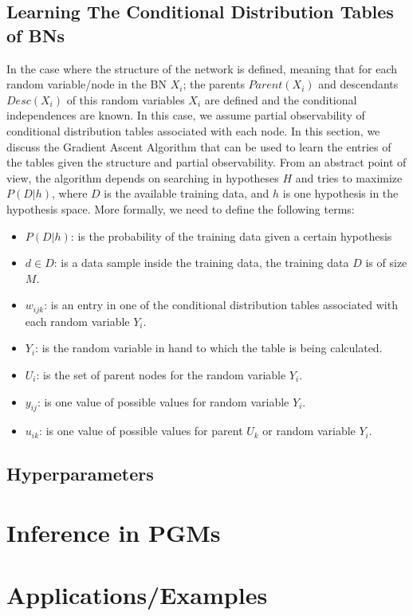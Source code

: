 \documentclass{article}
\begin{document}
\subsection{Learning The Conditional Distribution Tables of BNs}
In the case where the structure of the network is defined, meaning that for each random variable/node in the BN $X_i$; the parents $Parent(X_i)$ and descendants $Desc(X_i)$ of this random variables $X_i$ are defined and the conditional independences are known. In this case, we assume partial observability of conditional distribution tables associated with each node. In this section, we discuss the Gradient Ascent Algorithm that can be used to learn the entries of the tables given the structure and partial observability. From an abstract point of view, the algorithm depends on searching in hypotheses $H$ and tries to maximize $P(D|h)$, where $D$ is the available training data, and $h$ is one hypothesis in the hypothesis space. More formally, we need to define the following terms:
\begin{itemize}
\item $P(D|h)$: is the probability of the training data given a certain hypothesis
\item $d \in D$: is a data sample inside the training data, the training data $D$ is of size $M$.
\item $w_{ijk}$: is an entry in one of the conditional distribution tables associated with each random variable $Y_i$.
\item $Y_{i}$: is the random variable in hand to which the table is being calculated.
\item $U_{i}$: is the set of parent nodes for the random variable $Y_i$.
\item $y_{ij}$: is one value of possible values for random variable $Y_i$.
\item $u_{ik}$: is one value of possible values for parent $U_k$ or random variable $Y_i$.
\end{itemize}


\subsection{Hyperparameters}
\section{Inference in PGMs}
\section{Applications/Examples}
\end{document}
